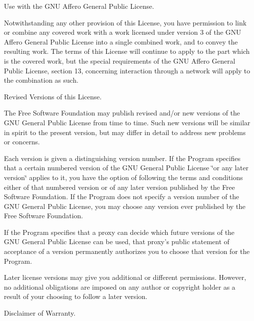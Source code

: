 \begin{DoxyEnumerate}
\item Use with the G\+N\+U Affero General Public License.
\end{DoxyEnumerate}

Notwithstanding any other provision of this License, you have permission to link or combine any covered work with a work licensed under version 3 of the G\+N\+U Affero General Public License into a single combined work, and to convey the resulting work. The terms of this License will continue to apply to the part which is the covered work, but the special requirements of the G\+N\+U Affero General Public License, section 13, concerning interaction through a network will apply to the combination as such.


\begin{DoxyEnumerate}
\item Revised Versions of this License.
\end{DoxyEnumerate}

The Free Software Foundation may publish revised and/or new versions of the G\+N\+U General Public License from time to time. Such new versions will be similar in spirit to the present version, but may differ in detail to address new problems or concerns.

Each version is given a distinguishing version number. If the Program specifies that a certain numbered version of the G\+N\+U General Public License \char`\"{}or any later version\char`\"{} applies to it, you have the option of following the terms and conditions either of that numbered version or of any later version published by the Free Software Foundation. If the Program does not specify a version number of the G\+N\+U General Public License, you may choose any version ever published by the Free Software Foundation.

If the Program specifies that a proxy can decide which future versions of the G\+N\+U General Public License can be used, that proxy's public statement of acceptance of a version permanently authorizes you to choose that version for the Program.

Later license versions may give you additional or different permissions. However, no additional obligations are imposed on any author or copyright holder as a result of your choosing to follow a later version.


\begin{DoxyEnumerate}
\item Disclaimer of Warranty.
\end{DoxyEnumerate}

